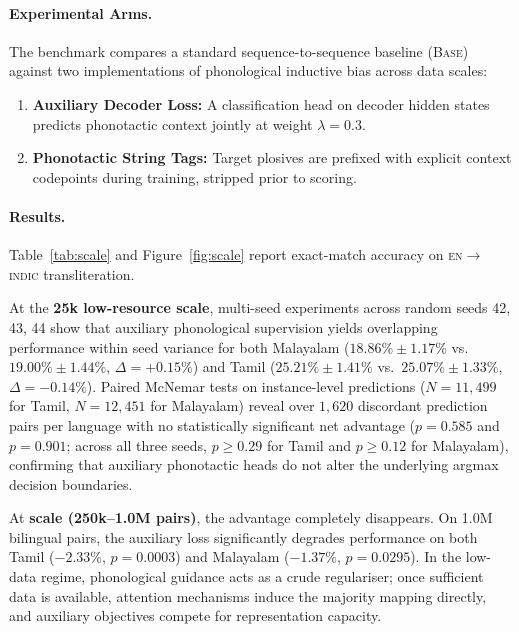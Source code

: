 \documentclass[11pt]{article}
\begin{document}


\paragraph{Experimental Arms.} The benchmark compares a standard sequence-to-sequence baseline (\textsc{Base})
against two implementations of phonological inductive bias across data scales:
\begin{enumerate}
    \item \textbf{Auxiliary Decoder Loss:} A classification head on decoder hidden states predicts
    phonotactic context jointly at weight $\lambda = 0.3$.
    \item \textbf{Phonotactic String Tags:} Target plosives are prefixed with explicit context
    codepoints during training, stripped prior to scoring.
\end{enumerate}

\paragraph{Results.} Table~\ref{tab:scale} and Figure~\ref{fig:scale} report exact-match accuracy
on \textsc{en}$\rightarrow$\textsc{indic} transliteration.

At the \textbf{25k low-resource scale}, multi-seed experiments across random seeds 42, 43, 44 show
that auxiliary phonological supervision yields overlapping performance within seed variance for both
Malayalam ($18.86\% \pm 1.17\%$ vs.\ $19.00\% \pm 1.44\%$, $\Delta = +0.15\%$) and Tamil ($25.21\% \pm 1.41\%$ vs.\
$25.07\% \pm 1.33\%$, $\Delta = -0.14\%$). Paired McNemar tests on instance-level predictions ($N=11{,}499$ for Tamil,
$N=12{,}451$ for Malayalam) reveal over $1{,}620$ discordant prediction pairs per language with no statistically
significant net advantage ($p = 0.585$ and $p = 0.901$; across all three seeds, $p \ge 0.29$ for Tamil and $p \ge 0.12$ for Malayalam),
confirming that auxiliary phonotactic heads do not alter the underlying argmax decision boundaries.

At \textbf{scale (250k--1.0M pairs)}, the advantage completely disappears. On 1.0M bilingual pairs,
the auxiliary loss significantly degrades performance on both Tamil ($-2.33\%$, $p = 0.0003$) and
Malayalam ($-1.37\%$, $p = 0.0295$). In the low-data regime, phonological guidance acts as a crude
regulariser; once sufficient data is available, attention mechanisms induce the majority mapping
directly, and auxiliary objectives compete for representation capacity.
\end{document}
